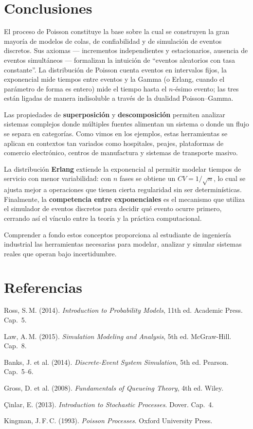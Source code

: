 \documentclass[11pt, letterpaper]{article}
\begin{document}
\section{Conclusiones}

El proceso de Poisson constituye la base sobre la cual se construyen la gran mayoría de modelos de colas, de confiabilidad y de simulación de eventos discretos. Sus axiomas --- incrementos independientes y estacionarios, ausencia de eventos simultáneos --- formalizan la intuición de ``eventos aleatorios con tasa constante''. La distribución de Poisson cuenta eventos en intervalos fijos, la exponencial mide tiempos entre eventos y la Gamma (o Erlang, cuando el parámetro de forma es entero) mide el tiempo hasta el $n$-ésimo evento; las tres están ligadas de manera indisoluble a través de la dualidad Poisson--Gamma.

Las propiedades de \textbf{superposición} y \textbf{descomposición} permiten analizar sistemas complejos donde múltiples fuentes alimentan un sistema o donde un flujo se separa en categorías. Como vimos en los ejemplos, estas herramientas se aplican en contextos tan variados como hospitales, peajes, plataformas de comercio electrónico, centros de manufactura y sistemas de transporte masivo.

La distribución \textbf{Erlang} extiende la exponencial al permitir modelar tiempos de servicio con menor variabilidad: con $n$ fases se obtiene un $CV = 1/\sqrt{n}$, lo cual se ajusta mejor a operaciones que tienen cierta regularidad sin ser determinísticas. Finalmente, la \textbf{competencia entre exponenciales} es el mecanismo que utiliza el simulador de eventos discretos para decidir qué evento ocurre primero, cerrando así el vínculo entre la teoría y la práctica computacional.

Comprender a fondo estos conceptos proporciona al estudiante de ingeniería industrial las herramientas necesarias para modelar, analizar y simular sistemas reales que operan bajo incertidumbre.

\vfill

\section*{Referencias}

\begin{enumerate}[label={[\arabic*]}]
    \item Ross, S.\,M. (2014). \textit{Introduction to Probability Models}, 11th ed. Academic Press. Cap.~5.
    \item Law, A.\,M. (2015). \textit{Simulation Modeling and Analysis}, 5th ed. McGraw-Hill. Cap.~8.
    \item Banks, J. et al. (2014). \textit{Discrete-Event System Simulation}, 5th ed. Pearson. Cap.~5--6.
    \item Gross, D. et al. (2008). \textit{Fundamentals of Queueing Theory}, 4th ed. Wiley.
    \item \c{C}inlar, E. (2013). \textit{Introduction to Stochastic Processes}. Dover. Cap.~4.
    \item Kingman, J.\,F.\,C. (1993). \textit{Poisson Processes}. Oxford University Press.
\end{enumerate}
\end{document}
